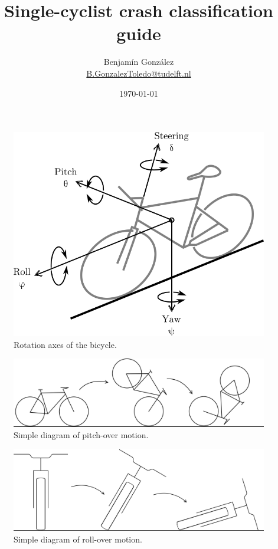 \documentclass{article}
\title{Single-cyclist crash classification guide}
\author{
  Benjam\'in Gonz\'alez\\
  \small{\href{mailto:b.gonzaleztoledo@tudelft.nl}{B.GonzalezToledo@tudelft.nl}}
  }
\date{\today}
\begin{document}
\maketitle


\begin{figure}[h]
    \centering
    \includegraphics[scale=1.0]{bike-dof.png}
    \caption{Rotation axes of the bicycle.}
    \label{fig: bike-dof}
\end{figure}

\begin{figure}[h]
    \centering
    \includegraphics[width=\linewidth]{pitch-over.png}
    \caption{Simple diagram of pitch-over motion.}
    \label{fig: pitchover}
\end{figure}

\begin{figure}[h]
    \centering
    \includegraphics[width=\linewidth]{roll-over.png}
    \caption{Simple diagram of roll-over motion.}
    \label{fig: rollover}
\end{figure}
\end{document}
